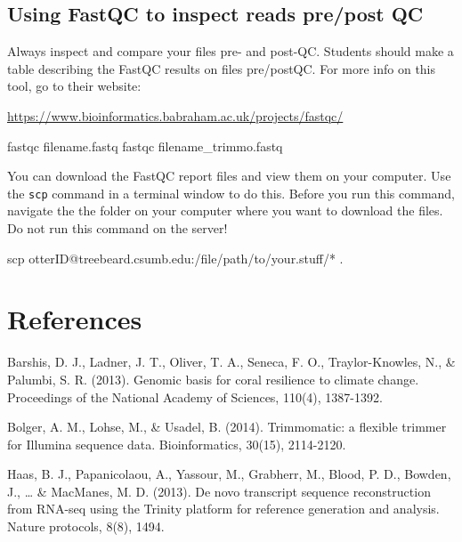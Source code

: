 \documentclass[]{article}
\newenvironment{Shaded}{\begin{snugshade}}{\end{snugshade}}
\newcommand{\ExtensionTok}[1]{#1}
\newcommand{\FunctionTok}[1]{\textcolor[rgb]{0.00,0.00,0.00}{#1}}
\newcommand{\NormalTok}[1]{#1}
\begin{document}
\hypertarget{using-fastqc-to-inspect-reads-prepost-qc}{%
\subsection{Using FastQC to inspect reads pre/post
QC}\label{using-fastqc-to-inspect-reads-prepost-qc}}

Always inspect and compare your files pre- and post-QC. Students should
make a table describing the FastQC results on files pre/postQC. For more
info on this tool, go to their website:

\url{https://www.bioinformatics.babraham.ac.uk/projects/fastqc/}

\begin{Shaded}
\begin{Highlighting}[]
\ExtensionTok{fastqc}\NormalTok{ filename.fastq}
\ExtensionTok{fastqc}\NormalTok{ filename_trimmo.fastq}
\end{Highlighting}
\end{Shaded}

You can download the FastQC report files and view them on your computer.
Use the \texttt{scp} command in a terminal window to do this. Before you
run this command, navigate the the folder on your computer where you
want to download the files. Do not run this command on the server!

\begin{Shaded}
\begin{Highlighting}[]
\FunctionTok{scp}\NormalTok{ otterID@treebeard.csumb.edu:/file/path/to/your.stuff/* .}
\end{Highlighting}
\end{Shaded}

\hypertarget{references}{%
\section{References}\label{references}}

Barshis, D. J., Ladner, J. T., Oliver, T. A., Seneca, F. O.,
Traylor-Knowles, N., \& Palumbi, S. R. (2013). Genomic basis for coral
resilience to climate change. Proceedings of the National Academy of
Sciences, 110(4), 1387-1392.

Bolger, A. M., Lohse, M., \& Usadel, B. (2014). Trimmomatic: a flexible
trimmer for Illumina sequence data. Bioinformatics, 30(15), 2114-2120.

Haas, B. J., Papanicolaou, A., Yassour, M., Grabherr, M., Blood, P. D.,
Bowden, J., \ldots{} \& MacManes, M. D. (2013). De novo transcript
sequence reconstruction from RNA-seq using the Trinity platform for
reference generation and analysis. Nature protocols, 8(8), 1494.
\end{document}
